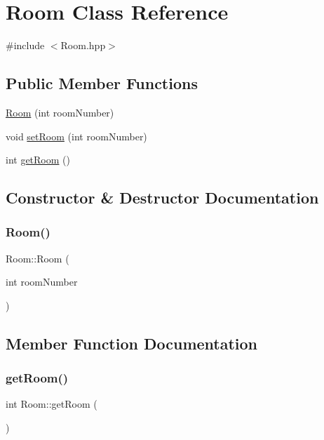 \hypertarget{class_room}{}\section{Room Class Reference}
\label{class_room}


{\ttfamily \#include $<$Room.\+hpp$>$}

\subsection*{Public Member Functions}
\begin{DoxyCompactItemize}
\item 
\mbox{\hyperlink{class_room_ad69bed5f7349a46fef507c5b578da770}{Room}} (int room\+Number)
\item 
void \mbox{\hyperlink{class_room_ae1645c6cc522f4b1c0ba980736cb440d}{set\+Room}} (int room\+Number)
\item 
int \mbox{\hyperlink{class_room_a1debd51acccea50674c56fd77b9d3f1f}{get\+Room}} ()
\end{DoxyCompactItemize}


\subsection{Constructor \& Destructor Documentation}
\mbox{\label{class_room_ad69bed5f7349a46fef507c5b578da770}} 
\subsubsection{\texorpdfstring{Room()}{Room()}}
{\footnotesize\ttfamily Room\+::\+Room (\begin{DoxyParamCaption}\item[{int}]{room\+Number }\end{DoxyParamCaption})}



\subsection{Member Function Documentation}
\mbox{\label{class_room_a1debd51acccea50674c56fd77b9d3f1f}} 
\subsubsection{\texorpdfstring{getRoom()}{getRoom()}}
{\footnotesize\ttfamily int Room\+::get\+Room (\begin{DoxyParamCaption}{ }\end{DoxyParamCaption})}

